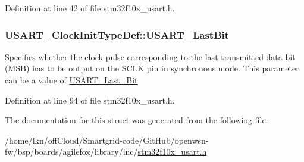 Definition at line 42 of file stm32f10x\+\_\+usart.\+h.

\subsubsection[{\texorpdfstring{U\+S\+A\+R\+T\+\_\+\+Last\+Bit}{USART_LastBit}}]{ U\+S\+A\+R\+T\+\_\+\+Clock\+Init\+Type\+Def\+::\+U\+S\+A\+R\+T\+\_\+\+Last\+Bit}\hypertarget{struct_u_s_a_r_t___clock_init_type_def_ab1b28d63d2be6e57849666d78a4467bd}{}\label{struct_u_s_a_r_t___clock_init_type_def_ab1b28d63d2be6e57849666d78a4467bd}
Specifies whether the clock pulse corresponding to the last transmitted data bit (M\+SB) has to be output on the S\+C\+LK pin in synchronous mode. This parameter can be a value of \hyperlink{group___u_s_a_r_t___last___bit}{U\+S\+A\+R\+T\+\_\+\+Last\+\_\+\+Bit} 

Definition at line 94 of file stm32f10x\+\_\+usart.\+h.



The documentation for this struct was generated from the following file\+:\begin{DoxyCompactItemize}
\item 
/home/lkn/off\+Cloud/\+Smartgrid-\/code/\+Git\+Hub/openwsn-\/fw/bsp/boards/agilefox/library/inc/\hyperlink{agilefox_2library_2inc_2stm32f10x__usart_8h}{stm32f10x\+\_\+usart.\+h}\end{DoxyCompactItemize}
